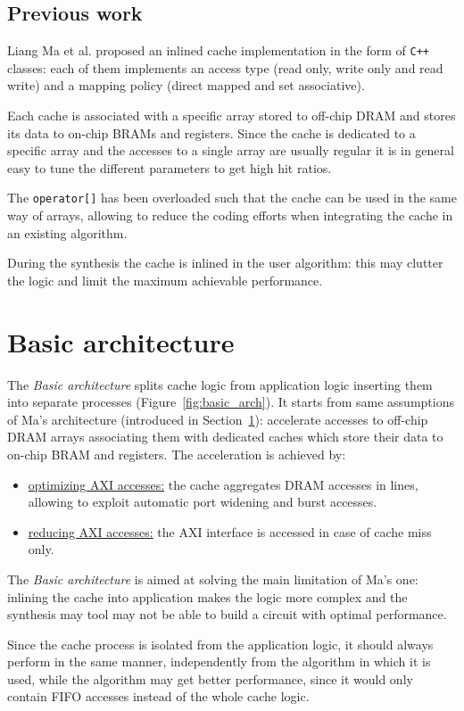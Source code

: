 \documentclass[11pt,a4paper]{memoir}
\begin{document}
\section{Previous work}\label{sec:liang}
Liang Ma et al. proposed an inlined cache implementation \cite{liang} in the
form of \texttt{C++} classes: each of them implements an access type (read
only, write only and read write) and a mapping policy (direct mapped and set
associative).

Each cache is associated with a specific array stored to off-chip DRAM and
stores its data to on-chip BRAMs and registers. Since the cache is dedicated to
a specific array and the accesses to a single array are usually regular it is in
general easy to tune the different parameters to get high hit ratios.

The \texttt{operator[]} has been overloaded such that the cache can be used in
the same way of arrays, allowing to reduce the coding efforts when integrating
the cache in an existing algorithm.

During the synthesis the cache is inlined in the user algorithm: this may
clutter the logic and limit the maximum achievable performance.

\chapter{Basic architecture}
The \emph{Basic architecture} splits cache logic from application logic
inserting them into separate processes (Figure~\ref{fig:basic_arch}).
It starts from same assumptions of Ma's architecture (introduced in
Section~\ref{sec:liang}): accelerate accesses to off-chip DRAM arrays
associating them with dedicated caches which store their data to on-chip BRAM
and registers.
The acceleration is achieved by:
\begin{itemize}
	\item \ul{optimizing AXI accesses:} the cache aggregates DRAM accesses
		in lines, allowing to exploit automatic port widening and burst
		accesses.
	\item \ul{reducing AXI accesses:} the AXI interface is accessed in case
		of cache miss only.
\end{itemize}

The \emph{Basic architecture} is aimed at solving the main limitation of Ma's
one: inlining the cache into application makes the logic more complex and the
synthesis may tool may not be able to build a circuit with optimal performance.

Since the cache process is isolated from the application logic, it should
always perform in the same manner, independently from the algorithm in which it
is used, while the algorithm may get better performance, since it would only
contain FIFO accesses instead of the whole cache logic.
\end{document}
